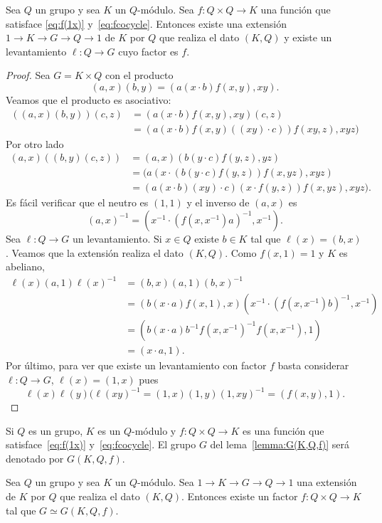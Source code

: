 \begin{lemma}
	\label{lemma:G(K,Q,f)}
	Sea $Q$ un grupo y sea $K$ un $Q$-módulo. Sea $f\colon Q\times Q\to K$ una
	función que satisface \eqref{eq:f(1x)} y~\eqref{eq:fcocycle}. Entonces
	existe una extensión $1\to K\to G\to Q\to 1$ de $K$ por $Q$ que realiza el
	dato $(K,Q)$ y existe un levantamiento $\ell\colon Q\to G$ cuyo factor es
	$f$.
\end{lemma}

\begin{proof}
	Sea $G=K\times Q$ con el producto
	\[
		(a,x)(b,y)=(a(x\cdot b)f(x,y),xy).
	\]
	Veamos que el producto es asociativo:
	\begin{align*}
		((a,x)(b,y))(c,z)&=(a(x\cdot b)f(x,y),xy)(c,z)\\
		&=(a(x\cdot b)f(x,y)((xy)\cdot c))f(xy,z),xyz)
	\end{align*}
	Por otro lado
	\begin{align*}
		(a,x)((b,y)(c,z)) &= (a,x)(b(y\cdot c)f(y,z),yz)\\
		&=(a(x\cdot (b(y\cdot c)f(y,z))f(x,yz),xyz)\\
		&=(a(x\cdot b)(xy)\cdot c)(x\cdot f(y,z))f(x,yz),xyz).
	\end{align*}
	Es fácil verificar que el neutro es $(1,1)$ y el inverso de $(a,x)$ es 
	\[
	(a,x)^{-1}=(x^{-1}\cdot (f(x,x^{-1})a)^{-1},x^{-1}).
	\]
	Sea $\ell\colon Q\to G$ un levantamiento. Si $x\in Q$ existe $b\in K$ tal
	que $\ell(x)=(b,x)$. Veamos que la extensión realiza el dato $(K,Q)$. Como
	$f(x,1)=1$ y $K$ es abeliano, 
	\begin{align*}
		\ell(x)(a,1)\ell(x)^{-1}
		&=(b,x)(a,1)(b,x)^{-1}\\
		&=(b(x\cdot a)f(x,1),x)(x^{-1}\cdot (f(x,x^{-1})b)^{-1},x^{-1})\\
		&=(b(x\cdot a)b^{-1}f(x,x^{-1})^{-1}f(x,x^{-1}),1)\\
		&=(x\cdot a,1).
	\end{align*}
	Por último, para ver que existe un levantamiento con factor $f$ basta
	considerar $\ell\colon Q\to G$, $\ell(x)=(1,x)$ pues 
	\[
		\ell(x)\ell(y)(\ell(xy)^{-1}=(1,x)(1,y)(1,xy)^{-1}=(f(x,y),1).
	\]
\end{proof}

Si $Q$ es un grupo, $K$ es un $Q$-módulo y $f\colon Q\times Q\to K$ es una
función que satisface~\eqref{eq:f(1x)} y~\eqref{eq:fcocycle}. El grupo $G$ del
lema~\ref{lemma:G(K,Q,f)} será denotado por $G(K,Q,f)$. 

\begin{lemma}
	\label{lemma:existe_f}
	Sea $Q$ un grupo y sea $K$ un $Q$-módulo. Sea $1\to K\to G\to Q\to 1$ una
	extensión de $K$ por $Q$ que realiza el dato $(K,Q)$. Entonces existe
	un factor $f\colon Q\times Q\to K$ tal que $G\simeq G(K,Q,f)$. 
\end{lemma}


